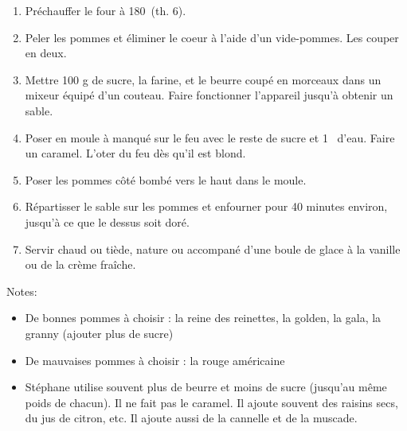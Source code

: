 
\begin{ingredients}
\end{ingredients}


\begin{recipe}
  \begin{enumerate}

  \item Pr\'echauffer le four \`a 180\C\ (th. 6).

  \item Peler les pommes et \'eliminer le coeur \`a l'aide d'un
    vide-pommes.  Les couper en deux.

  \item Mettre 100 g de sucre, la farine, et le beurre coup\'e en
    morceaux dans un mixeur \'equip\'e d'un couteau.  Faire
    fonctionner l'appareil jusqu'\`a obtenir un sable.

  \item Poser en moule \`a manqu\'e sur le feu avec le reste de sucre
    et 1 \ccf\ d'eau.  Faire un caramel.  L'oter du feu d\`es qu'il
    est blond.

  \item Poser les pommes c\^ot\'e bomb\'e vers le haut dans le moule.

  \item R\'epartisser le sable sur les pommes et enfourner pour 40
    minutes environ, jusqu'\`a ce que le dessus soit dor\'e.

  \item Servir chaud ou ti\`ede, nature ou accompan\'e d'une boule de
    glace \`a la vanille ou de la cr\`eme fra\^iche.

  \end{enumerate}
\end{recipe}

Notes:
\begin{itemize}
\item De bonnes pommes \`a choisir : la reine des reinettes, la
  golden, la gala, la granny (ajouter plus de sucre)
\item De mauvaises pommes \`a choisir : la rouge am\'ericaine
\item St\'ephane utilise souvent plus de beurre et moins de sucre
  (jusqu'au m\^eme poids de chacun).  Il ne fait pas le caramel.
  Il ajoute souvent des raisins secs, du jus de citron, etc.  Il
  ajoute aussi de la cannelle et de la muscade.
\end{itemize}
